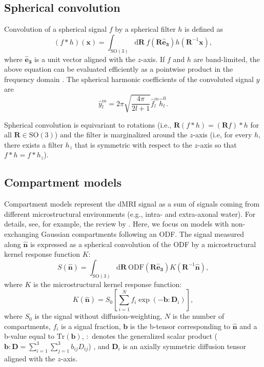 \documentclass[10pt, letterpaper, oneside]{article}
\begin{document}
\subsection{Spherical convolution}

Convolution of a spherical signal $f$ by a spherical filter $h$ is defined as
\begin{equation}\label{eq:sph_conv}
(f * h)(\mathbf{x}) = \int_{\text{SO}(3)} \text{d}\mathbf{R} \ f(\mathbf{R} \mathbf{\hat{e}_3}) h(\mathbf{R}^{-1} \mathbf{x}) , 
\end{equation}
where $\mathbf{\hat{e}_3}$ is a unit vector aligned with the $z$-axis. If $f$ and $h$ are band-limited, the above equation can be evaluated efficiently as a pointwise product in the frequency domain \citep{driscoll1994computing}. The spherical harmonic coefficients of the convoluted signal $y$ are
\begin{equation}\label{eq:sph_conv_sh}
\hat{y}_l^m = 2 \pi \sqrt{\frac{4 \pi}{2l + 1}} \hat{f}_l^m \hat{h}_l^0 .
\end{equation}

Spherical convolution is equivariant to rotations (i.e., $\mathbf{R}(f * h) = (\mathbf{R}f) * h$ for all $\mathbf{R} \in \text{SO}(3)$) and the filter is marginalized around the $z$-axis (i.e, for every $h$, there exists a filter $h_z$ that is symmetric with respect to the $z$-axis so that $f * h = f * h_z$).

\subsection{Compartment models}

Compartment models represent the dMRI signal as a sum of signals coming from different microstructural environments (e.g., intra- and extra-axonal water). For details, see, for example, the review by \cite{jelescu2017design}. Here, we focus on models with non-exchanging Gaussian compartments following an ODF. The signal measured along $\mathbf{\hat{n}}$ is expressed as a spherical convolution of the ODF by a microstructural kernel response function $K$: 
\begin{equation}\label{eq:model_signal}
S(\mathbf{\hat{n}}) = \int_{\text{SO}(3)} \text{d}\mathbf{R} \ \text{ODF}(\mathbf{R} \mathbf{\hat{e}_3}) K(\mathbf{R}^{-1} \mathbf{\hat{n}}) ,
\end{equation}
where $K$ is the microstructural kernel response function:
\begin{equation}
K(\mathbf{\hat{n}}) = S_0 \left[ \sum_{i=1}^N f_i \exp(- \mathbf{b}:\mathbf{D}_i) \right] ,
\end{equation}
where $S_0$ is the signal without diffusion-weighting, $N$ is the number of compartments, $f_i$ is a signal fraction, $\mathbf{b}$ is the b-tensor corresponding to $\mathbf{\hat{n}}$ and a b-value equal to $\text{Tr}(\mathbf{b})$, $:$ denotes the generalized scalar product ($\mathbf{b}:\mathbf{D} = \sum_{i=1}^3 \sum_{j=1}^3 b_{ij} D_{ij}$) \citep{westin2016q}, and $\mathbf{D}_i$ is an axially symmetric diffusion tensor aligned with the $z$-axis.
\end{document}
